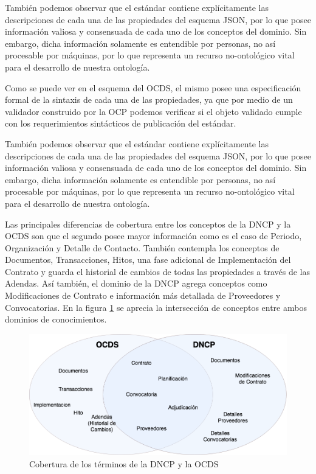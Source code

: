 También podemos observar que el estándar contiene explícitamente las descripciones de cada una de las propiedades del esquema JSON, por lo que posee información valiosa y consensuada de cada uno de los conceptos del dominio. Sin embargo, dicha información solamente es entendible por personas, no así procesable por máquinas, por lo que representa un recurso no-ontológico vital para el desarrollo de nuestra ontología.

Como se puede ver en el esquema del OCDS, el mismo posee una especificación formal de la sintaxis de cada una de las propiedades, ya que por medio de un validador construido por la OCP podemos verificar si el objeto validado cumple con los requerimientos sintácticos de publicación del estándar.

También podemos observar que el estándar contiene explícitamente las descripciones de cada una de las propiedades del esquema JSON, por lo que posee información valiosa y consensuada de cada uno de los conceptos del dominio. Sin embargo, dicha información solamente es entendible por personas, no así procesable por máquinas, por lo que representa un recurso no-ontológico vital para el desarrollo de nuestra ontología.


Las principales diferencias de cobertura entre los conceptos de la DNCP y la OCDS son que el segundo posee mayor información como es el caso de Periodo, Organización y Detalle de Contacto. También contempla los conceptos de Documentos, Transacciones, Hitos, una fase adicional de Implementación del Contrato y guarda el historial de cambios de todas las propiedades a través de las Adendas. Así también, el dominio de la DNCP agrega conceptos como Modificaciones de Contrato e información más detallada de Proveedores y Convocatorias. En la figura \ref{img:cobertura de la ontologia } se aprecia la intersección de conceptos entre ambos dominios de conocimientos.

    \begin{figure}[h!]
    \centering
    \includegraphics[width=150mm]{figuras/Diagramas-VennCobertura}
    \caption{Cobertura de los términos de la DNCP y la OCDS}
    \label{img:cobertura de la ontologia }
    \end{figure}

